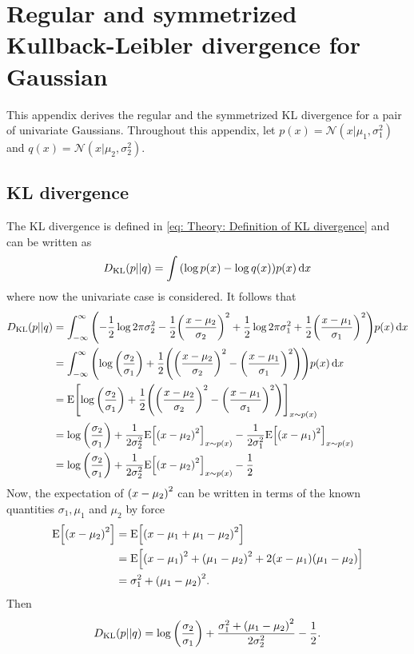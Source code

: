 
\chapter{Regular and symmetrized Kullback-Leibler divergence for Gaussian}\label{app: Regular and symmetrized Kullback-Leibler divergence for univariate Gaussian}
This appendix derives the regular and the symmetrized \gls{KL} divergence for a pair of univariate Gaussians. Throughout this appendix, let $p(x)=\mathcal{N}(x|\mu_1,\sigma_1^2)$ and $q(x)=\mathcal{N}(x|\mu_2,\sigma_2^2)$.

\section{KL divergence}
The \gls{KL} divergence is defined in \eqref{eq: Theory: Definition of KL divergence} and can be written as
\begin{equation}
    D_\text{KL}(p||q) = \int {\left(\log p(x) - \log q(x)\right)}p(x)\,\text{d}x
\end{equation}
where now the univariate case is considered. It follows that 
\begin{align}
    D_\text{KL}(p||q)
    &= \int_{-\infty}^{\infty} {\left(-\frac{1}{2}\log 2\pi\sigma_2^2-\frac{1}{2}{\left(\frac{x-\mu_2}{\sigma_2}\right)}^2 + \frac{1}{2}\log 2\pi\sigma_1^2+\frac{1}{2}{\left(\frac{x-\mu_1}{\sigma_1}\right)}^2\right)}p(x)\,\text{d}x\\
    &= \int_{-\infty}^{\infty} {\left(\log{\left(\frac{\sigma_2}{\sigma_1}\right)} + \frac{1}{2}{\left({\left(\frac{x-\mu_2}{\sigma_2}\right)}^2 - {\left(\frac{x-\mu_1}{\sigma_1}\right)}^2\right)}\right)}p(x)\,\text{d}x\\
    &= \text{E}{\left[\log{\left(\frac{\sigma_2}{\sigma_1}\right)} + \frac{1}{2}{\left({\left(\frac{x-\mu_2}{\sigma_2}\right)}^2 - {\left(\frac{x-\mu_1}{\sigma_1}\right)}^2\right)}\right]}_{x\sim p(x)}\\
    &= \log{\left(\frac{\sigma_2}{\sigma_1}\right)} + \frac{1}{2\sigma_2^2}\text{E}{\left[{\left(x-\mu_2\right)}^2\right]}_{x\sim p(x)} -  \frac{1}{2\sigma_1^2}\text{E}{\left[{\left(x-\mu_1\right)}^2\right]}_{x\sim p(x)}\\
    &= \log{\left(\frac{\sigma_2}{\sigma_1}\right)} + \frac{1}{2\sigma_2^2}\text{E}{\left[{\left(x-\mu_2\right)}^2\right]}_{x\sim p(x)} - \frac{1}{2}
\end{align}
Now, the expectation of ${\left(x-\mu_2\right)}^2$ can be written in terms of the known quantities $\sigma_1, \mu_1$ and $\mu_2$ by force
\begin{align}
    \text{E}{\left[{\left(x-\mu_2\right)}^2\right]} &= \text{E}{\left[{\left(x-\mu_1+\mu_1-\mu_2\right)}^2\right]}\\
    &= \text{E}{\left[{\left(x-\mu_1\right)}^2+{\left(\mu_1-\mu_2\right)}^2+2{\left(x-\mu_1\right)}{\left(\mu_1-\mu_2\right)}\right]}\\
    &= \sigma_1^2+{\left(\mu_1-\mu_2\right)}^2.
\end{align}
Then
\begin{equation}
    D_\text{KL}(p||q) = \log{\left(\frac{\sigma_2}{\sigma_1}\right)} + \frac{\sigma_1^2+{\left(\mu_1-\mu_2\right)}^2}{2\sigma_2^2} - \frac{1}{2}.
\end{equation}


